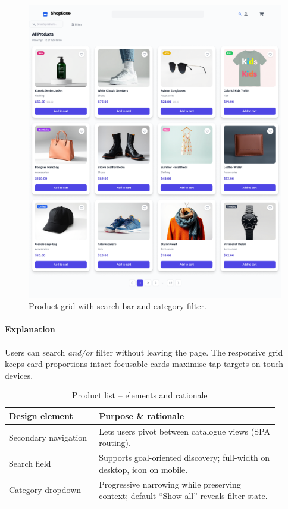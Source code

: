 \documentclass[11pt,a4paper]{article}
\begin{document}
\begin{figure}[H]
	\centering
	\includegraphics[width=\linewidth]{Product_List_Figma.png}%
	\caption{Product grid with search bar and category filter.}
	\label{fig:ui-products}
\end{figure}

\paragraph{Explanation}%
Users can search \emph{and/or} filter without leaving the page.  
The responsive grid keeps card proportions intact  focusable
cards maximise tap targets on touch devices.

\begin{table}[H]
	\centering
	\caption{Product list – elements and rationale}
	\label{tab:product-elements}
	\begin{tabular}{p{0.30\linewidth} p{0.60\linewidth}}
		\toprule
		\textbf{Design element} & \textbf{Purpose \& rationale} \\ \midrule
		Secondary navigation    & Lets users pivot between catalogue views (SPA routing).\\
		Search field            & Supports goal-oriented discovery; full-width on desktop, icon on mobile.\\
		Category dropdown       & Progressive narrowing while preserving context; default “Show all” reveals filter state.\\
	
	
		\bottomrule
	\end{tabular}
\end{table}
\end{document}
